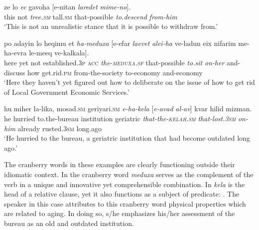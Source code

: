 \documentclass[output=paper]{langsci/langscibook}
\begin{document}
    \ea\label{she:ec-rc}
        \gll ze lo \textit{{\ayin}ec} gavoha \textnormal{[}{\shin}e-nitan \textit{laredet} \textit{mime-no}\textnormal{]}.\\
            this not  \textit{tree.\textsc{sm}} tall.\textsc{sm} \spacebr{}that-possible \textit{to.descend} \textit{from-him}\\
        \glt `This is not an unrealistic stance that it is possible to withdraw from.'
    \z

    \ea\label{she:meduxa-rc}
        \gll po {\ayin}adayin lo heqimu {\alef}et \textit{ha-meduxa} \textnormal{[}{\shin}e-{\alef}ef{\shin}ar \textit{la{\shin}evet} \textit{{\ayin}alei-ha} ve-ladun {\alef}eix nif{\tet}arim me-ha-{\het}evra le-me{\shin}eq ve-kalkala\textnormal{]}.\\
            here yet not established.\textsc{3p} \textsc{acc} \textit{the-\textsc{meduxa}.\textsc{sf}} \spacebr{}that-possible \textit{to.sit} \textit{on-her} and-discuss how get.rid.\textsc{pm} from-the-society to-economy and-economy\\
        \glt `Here they haven't yet figured out how to deliberate on the issue of how to get rid of Local Government Economic Services.'
    \z

    \ea\label{she:kelax-rc}
        \gll hu miher la-li{\shin}ka, mosad.\textsc{sm} geriya{\tet}ri.\textsc{sm} \textit{{\shin}e-ha-kela{\het}} \textnormal{[}\textit{{\shin}e-{\alef}avad} \textit{{\ayin}al-av}\textnormal{]} kvar hi{\het}lid mizman.\\
            he hurried to.the-bureau institution geriatric \textit{that-the-\textsc{kelah}.\textsc{sm}} \spacebr{}\textit{that-lost.\textsc{3sm}} \textit{on-him} already rusted.\textsc{3sm} long.ago\\
        \glt `He hurried to the bureau, a geriatric institution that had become outdated long ago.'
    \z

The cranberry words in these examples are clearly functioning outside their idiomatic context. In  the cranberry word \textit{meduxa} serves as the complement of the verb  in a unique and innovative yet comprehensible combination. In  \textit{kela{\het}} is the head of a relative clause, yet it also functions as a subject of predicate: . The speaker in this case attributes to this cranberry word physical properties which are related to aging. In doing so, s/he emphasizes his\slash her assessment of the bureau as an old and outdated institution.
\end{document}
